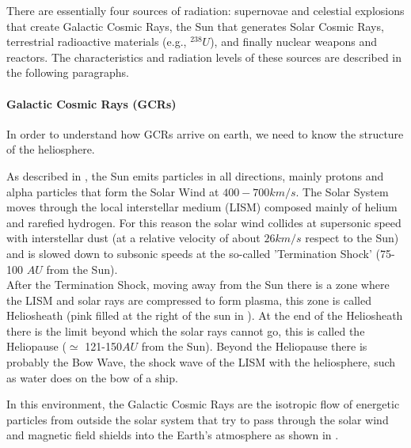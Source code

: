 {{{{				There are essentially four sources of radiation: supernovae and celestial explosions that create Galactic Cosmic Rays, the Sun that generates Solar Cosmic Rays, terrestrial radioactive materials (e.g., $^{238}U$), and finally nuclear weapons and reactors. The characteristics and radiation levels of these sources are described in the following paragraphs.
				
				
				\paragraph{Galactic Cosmic Rays (GCRs)}{
						In order to understand how GCRs arrive on earth, we need to know the structure of the heliosphere. 
						
						
						As described in , the Sun emits particles in all directions, mainly protons and alpha particles that form the Solar Wind at $400-700km/s$. 
						The Solar System moves through the local interstellar medium (LISM) composed mainly of helium and rarefied hydrogen. 
						For this reason the solar wind collides at supersonic speed with interstellar dust (at a relative velocity of about $26km/s$ respect to the Sun) and is slowed down to subsonic speeds at the so-called 'Termination Shock' (75-100 $AU$ from the Sun). \\
						
						After the Termination Shock, moving away from the Sun there is a zone where the LISM and solar rays are compressed to form plasma, this zone is called Heliosheath (pink filled at the right of the sun in ). At the end of the Heliosheath there is the limit beyond which the solar rays cannot go, this is called the Heliopause ($\simeq$ 121-150$AU$ from the Sun). Beyond the Heliopause there is probably the Bow Wave, the shock wave of the LISM with the heliosphere, such as water does on the bow of a ship.
						
						
					
						In this environment, the Galactic Cosmic Rays are the isotropic flow of energetic particles from outside the solar system that try to pass through the solar wind and magnetic field shields into the Earth's atmosphere as shown in . 
						
}}}}}
